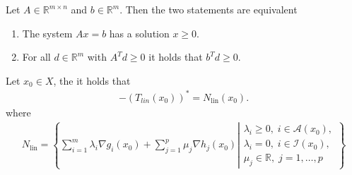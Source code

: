 \begin{lemma}
    \label{lem: ferkas}
    Let $A \in \mathbb{R}^{m \times n}$ and $b \in \mathbb{R}^{m}$. Then
    the two statements are equivalent
    \begin{enumerate}[nosep]
        \item The system $Ax = b$ has a solution $x\ge0$.
        \item For all $d \in \mathbb{R}^{m}$ with $A^{T} d \ge 0$ it holds
            that $b^{T} d  \ge 0$.
    \end{enumerate}
\end{lemma}
%
\begin{theorem}
    \label{thm: duality}
    Let $x_0 \in X$, the it holds that
    \begin{align}
        -(T_{lin}(x_0))^{*} = N_{\text{lin} }(x_0).
    \end{align}
    where
    \begin{align}
        N_{\text{lin}} =
        \left\{
            \sum_{i=1}^{m} \lambda_i \nabla g_i(x_0)
            + \sum_{j=1}^{p} \mu_j\nabla h_j(x_0)
             \left|
             \begin{array}{l}
                \lambda_i \ge 0,\; i \in \mathcal{A}(x_0),\\
                \lambda_i = 0,\; i \in \mathcal{I}(x_0),\\
                \mu_j \in \mathbb{R},\; j=1,\ldots,p
            \end{array}
        \right\} \right.
    \end{align}
\end{theorem}
